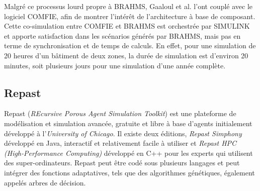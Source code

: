 Malgré ce processus lourd propre à BRAHMS, Gaaloul et al. \cite{Gaaloul-12} l'ont couplé avec le logiciel COMFIE, afin de montrer l'intérêt de l'architecture à base de composant. Cette co-simulation entre COMFIE et BRAHMS est orchestrée par SIMULINK et apporte satisfaction dans les scénarios générés par BRAHMS, mais pas en terme de synchronisation et de temps de calculs. En effet, pour une simulation de 20 heures d'un bâtiment de deux zones, la durée de simulation est d'environ 20 minutes, soit plusieurs jours pour une simulation d'une année complète. 

\subsection{Repast}

Repast (\textit{REcursive Porous Agent Simulation Toolkit}) est une plateforme de modélisation et simulation avancée, gratuite et libre à base d'agents initialement développé à l'\textit{University of Chicago}. Il existe deux éditions, \textit{Repast Simphony} développé en Java, interactif et relativement facile à utiliser et \textit{Repast HPC (High-Performance Computing)} développé en C++ pour les experts qui utilisent des super-ordinateurs. Repast peut être codé sous plusieurs langages et peut intégrer des fonctions adaptatives, tels que des algorithmes génétiques, également appelés arbres de décision.


